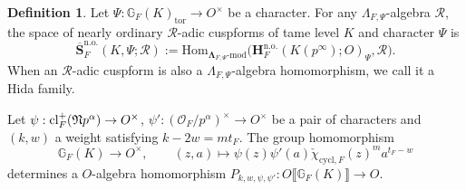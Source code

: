 \documentclass[10pt]{amsart}
\numberwithin{equation}{section}
\theoremstyle{definition}
\newtheorem{defn}[thm]{Definition}
\theoremstyle{remark} %
\newcommand{\bb}{\mathbb}
\newcommand{\bs}{\boldsymbol}
\newcommand{\mbf}{\mathbf}
\newcommand{\mrm}{\mathrm}
\newcommand{\R}{\mathcal{R}}
\begin{document}
	\begin{defn}\label{def I-adic cuspforms}
		Let $\Psi: \bb{G}_F(K)_\mrm{tor} \rightarrow O^\times$ be a character. For any $\Lambda_{F,\Psi}$-algebra  $\R$, the space of nearly ordinary $\R$-adic cuspforms of tame level $K$ and character $\Psi$ is 
		\[
		\overline{\mbf{S}}_F^\mrm{n.o.}(K,\Psi;\R) :=
		\mrm{Hom}_{\bs{\Lambda}_{F,\Psi}\mbox{-}\mrm{mod}} \big( \mbf{H}_F^\mrm{n.o.}(K(p^\infty);O)_\Psi, \R\big).
		\]
		When an $\R$-adic cuspform is also a $\Lambda_{F,\Psi}$-algebra homomorphism, we call it a Hida family.
	\end{defn}
	
	
	Let
	$\psi: \mrm{cl}_F^+(\frak{N}p^\alpha) \rightarrow O^\times$,
	$\psi': (\mathcal{O}_F/p^\alpha)^\times \rightarrow O^\times$  be a pair of characters 
	and  $(k,w)$ a weight satisfying $k-2w = mt_F$. The group homomorphism
	\[
	\bb{G}_F(K)\to O^\times,\qquad (z,a) \mapsto \psi(z)\psi'(a)\check{\chi}_{\mrm{cycl},F}(z)^ma^{t_F-w}
	\]
	determines a $O$-algebra homomorphism $P_{k,w,\psi,\psi'}:O\llbracket\bb{G}_F(K) \rrbracket\rightarrow O$.
	
	
	
\end{document}
